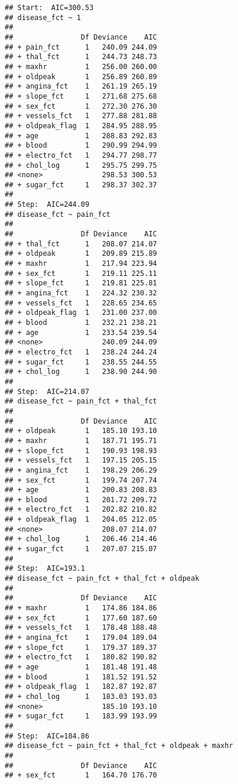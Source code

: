 \documentclass[
]{article}
\begin{document}
\begin{verbatim}
## Start:  AIC=300.53
## disease_fct ~ 1
## 
##                Df Deviance    AIC
## + pain_fct      1   240.09 244.09
## + thal_fct      1   244.73 248.73
## + maxhr         1   256.00 260.00
## + oldpeak       1   256.89 260.89
## + angina_fct    1   261.19 265.19
## + slope_fct     1   271.68 275.68
## + sex_fct       1   272.30 276.30
## + vessels_fct   1   277.88 281.88
## + oldpeak_flag  1   284.95 288.95
## + age           1   288.83 292.83
## + blood         1   290.99 294.99
## + electro_fct   1   294.77 298.77
## + chol_log      1   295.75 299.75
## <none>              298.53 300.53
## + sugar_fct     1   298.37 302.37
## 
## Step:  AIC=244.09
## disease_fct ~ pain_fct
## 
##                Df Deviance    AIC
## + thal_fct      1   208.07 214.07
## + oldpeak       1   209.89 215.89
## + maxhr         1   217.94 223.94
## + sex_fct       1   219.11 225.11
## + slope_fct     1   219.81 225.81
## + angina_fct    1   224.32 230.32
## + vessels_fct   1   228.65 234.65
## + oldpeak_flag  1   231.00 237.00
## + blood         1   232.21 238.21
## + age           1   233.54 239.54
## <none>              240.09 244.09
## + electro_fct   1   238.24 244.24
## + sugar_fct     1   238.55 244.55
## + chol_log      1   238.90 244.90
## 
## Step:  AIC=214.07
## disease_fct ~ pain_fct + thal_fct
## 
##                Df Deviance    AIC
## + oldpeak       1   185.10 193.10
## + maxhr         1   187.71 195.71
## + slope_fct     1   190.93 198.93
## + vessels_fct   1   197.15 205.15
## + angina_fct    1   198.29 206.29
## + sex_fct       1   199.74 207.74
## + age           1   200.83 208.83
## + blood         1   201.72 209.72
## + electro_fct   1   202.82 210.82
## + oldpeak_flag  1   204.05 212.05
## <none>              208.07 214.07
## + chol_log      1   206.46 214.46
## + sugar_fct     1   207.07 215.07
## 
## Step:  AIC=193.1
## disease_fct ~ pain_fct + thal_fct + oldpeak
## 
##                Df Deviance    AIC
## + maxhr         1   174.86 184.86
## + sex_fct       1   177.60 187.60
## + vessels_fct   1   178.48 188.48
## + angina_fct    1   179.04 189.04
## + slope_fct     1   179.37 189.37
## + electro_fct   1   180.82 190.82
## + age           1   181.48 191.48
## + blood         1   181.52 191.52
## + oldpeak_flag  1   182.87 192.87
## + chol_log      1   183.03 193.03
## <none>              185.10 193.10
## + sugar_fct     1   183.99 193.99
## 
## Step:  AIC=184.86
## disease_fct ~ pain_fct + thal_fct + oldpeak + maxhr
## 
##                Df Deviance    AIC
## + sex_fct       1   164.70 176.70

\end{verbatim}
\end{document}
